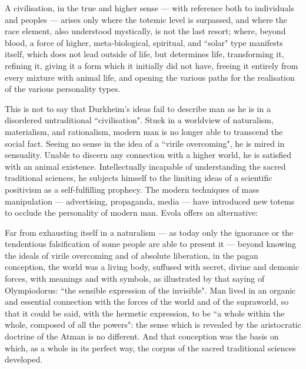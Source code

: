 \begin{quotex}
A civilisation, in the true and higher sense — with reference both to individuals and peoples — arises only where the totemic level is surpassed, and where the race element, also understood mystically, is not the last resort; where, beyond blood, a force of higher, meta-biological, spiritual, and ``solar" type manifests itself, which does not lead outside of life, but determines life, transforming it, refining it, giving it a form which it initially did not have, freeing it entirely from every mixture with animal life, and opening the various paths for the realisation of the various personality types. 

\end{quotex}
This is not to say that Durkheim's ideas fail to describe man as he is in a disordered untraditional ``civilisation". Stuck in a worldview of naturalism, materialism, and rationalism, modern man is no longer able to transcend the social fact. Seeing no sense in the idea of a ``virile overcoming", he is mired in sensuality. Unable to discern any connection with a higher world, he is satisfied with an animal existence. Intellectually incapable of understanding the sacred traditional sciences, he subjects himself to the limiting ideas of a scientific positivism as a self-fulfilling prophecy. The modern techniques of mass manipulation — advertising, propaganda, media — have introduced new totems to occlude the personality of modern man. Evola offers an alternative:

\begin{quotex}
Far from exhausting itself in a naturalism — as today only the ignorance or the tendentious falsification of some people are able to present it — beyond knowing the ideals of virile overcoming and of absolute liberation, in the pagan conception, the world was a living body, suffused with secret, divine and demonic forces, with meanings and with symbols, as illustrated by that saying of Olympiodorus: ``the sensible expression of the invisible". Man lived in an organic and essential connection with the forces of the world and of the supraworld, so that it could be said, with the hermetic expression, to be ``a whole within the whole, composed of all the powers": the sense which is revealed by the aristocratic doctrine of the Atman is no different. And that conception was the basis on which, as a whole in its perfect way, the corpus of the sacred traditional sciences developed. 

\end{quotex}


